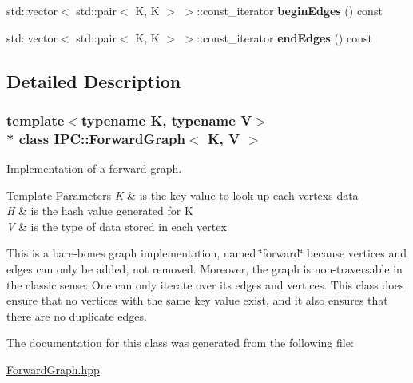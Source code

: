 \begin{DoxyCompactItemize}
\item 
std\+::vector$<$ std\+::pair$<$ K, K $>$ $>$\+::const\+\_\+iterator {\bfseries begin\+Edges} () const \hypertarget{class_i_p_c_1_1_forward_graph_a4c08748a319410c00ed17af828cda210}{}\label{class_i_p_c_1_1_forward_graph_a4c08748a319410c00ed17af828cda210}

\item 
std\+::vector$<$ std\+::pair$<$ K, K $>$ $>$\+::const\+\_\+iterator {\bfseries end\+Edges} () const \hypertarget{class_i_p_c_1_1_forward_graph_a980a27ec3ec3dc4a6fb0d8c668996624}{}\label{class_i_p_c_1_1_forward_graph_a980a27ec3ec3dc4a6fb0d8c668996624}

\end{DoxyCompactItemize}


\subsection{Detailed Description}
\subsubsection*{template$<$typename K, typename V$>$\\*
class I\+P\+C\+::\+Forward\+Graph$<$ K, V $>$}

Implementation of a forward graph. 


\begin{DoxyTemplParams}{Template Parameters}
{\em K} & is the key value to look-\/up each vertex\textquotesingle{}s data \\
\hline
{\em H} & is the hash value generated for K \\
\hline
{\em V} & is the type of data stored in each vertex\\
\hline
\end{DoxyTemplParams}
This is a bare-\/bones graph implementation, named \char`\"{}forward\char`\"{} because vertices and edges can only be added, not removed. Moreover, the graph is non-\/traversable in the classic sense\+: One can only iterate over its edges and vertices. This class does ensure that no vertices with the same key value exist, and it also ensures that there are no duplicate edges. 

The documentation for this class was generated from the following file\+:\begin{DoxyCompactItemize}
\item 
\hyperlink{_forward_graph_8hpp}{Forward\+Graph.\+hpp}\end{DoxyCompactItemize}
